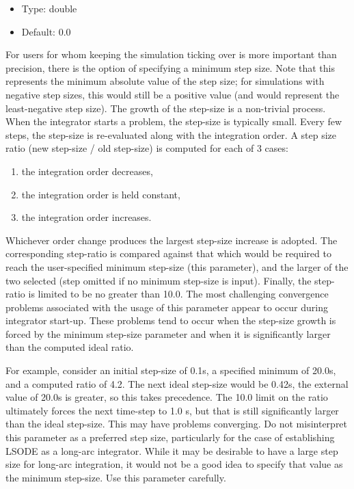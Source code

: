 \begin{itemize}
\item
Type: double
\item
Default: 0.0
\end{itemize}
For users for whom keeping the simulation ticking over is more important
than precision, there is the option of specifying a minimum step size.
 Note that this represents the minimum absolute value of the step size;
for simulations with negative step sizes, this would still be a positive
value (and would represent the least-negative step size).
The growth of the step-size is a non-trivial process.  When the integrator
starts a problem, the step-size is typically small.  Every few steps,
the step-size is re-evaluated along with the integration order.  A step
size ratio (new step-size / old step-size) is computed for each of 3 cases:
\begin{enumerate}
\item the integration order decreases,
\item the integration order is held constant,
\item the integration order increases.
\end{enumerate}
Whichever order change produces the largest step-size increase is adopted.
 The corresponding step-ratio is compared against that which would be
required to reach the user-specified minimum step-size (this parameter),
and the larger of the two selected (step omitted if no minimum step-size
is input).  Finally, the step-ratio is limited to be no greater than 10.0.
The most challenging convergence problems associated with the usage of
this parameter appear to occur during integrator start-up.  These problems
tend to occur when the step-size growth is forced by the minimum step-size
parameter and when it is significantly larger than the computed ideal
ratio.

For example, consider an initial step-size of 0.1s, a specified minimum
of 20.0s, and a computed ratio of 4.2.  The next ideal step-size would
be 0.42s, the external value of 20.0s is greater, so this takes precedence.
 The 10.0 limit on the ratio ultimately forces the next time-step to 1.0
s, but that is still significantly larger than the ideal step-size.  This
may have problems converging.
Do not misinterpret this parameter as a preferred step size, particularly
for the case of establishing LSODE as a long-arc integrator.  While it
may be desirable to have a large step size for long-arc integration, it
would not be a good idea to specify that value as the minimum step-size.
 Use this parameter carefully.
